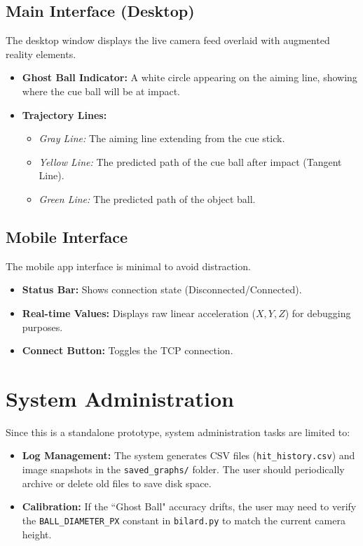 \subsection{Main Interface (Desktop)}
The desktop window displays the live camera feed overlaid with augmented reality elements.
\begin{itemize}
    \item \textbf{Ghost Ball Indicator:} A white circle appearing on the aiming line, showing where the cue ball will be at impact.
    \item \textbf{Trajectory Lines:}
    \begin{itemize}
        \item \textit{Gray Line:} The aiming line extending from the cue stick.
        \item \textit{Yellow Line:} The predicted path of the cue ball after impact (Tangent Line).
        \item \textit{Green Line:} The predicted path of the object ball.
    \end{itemize}
\end{itemize}

\subsection{Mobile Interface}
The mobile app interface is minimal to avoid distraction.
\begin{itemize}
    \item \textbf{Status Bar:} Shows connection state (Disconnected/Connected).
    \item \textbf{Real-time Values:} Displays raw linear acceleration ($X, Y, Z$) for debugging purposes.
    \item \textbf{Connect Button:} Toggles the TCP connection.
\end{itemize}

\section{System Administration}

Since this is a standalone prototype, system administration tasks are limited to:
\begin{itemize}
    \item \textbf{Log Management:} The system generates CSV files (\texttt{hit\_history.csv}) and image snapshots in the \texttt{saved\_graphs/} folder. The user should periodically archive or delete old files to save disk space.
    \item \textbf{Calibration:} If the ``Ghost Ball" accuracy drifts, the user may need to verify the \texttt{BALL\_DIAMETER\_PX} constant in \texttt{bilard.py} to match the current camera height.
\end{itemize}

